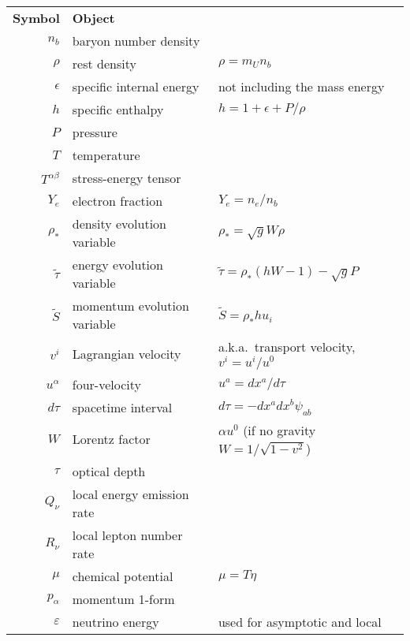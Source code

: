 \begin{table}
  \centering
  \begin{tabular}{rll}
    \textbf{Symbol}       & \textbf{Object}           & \\%
    $n_b$                 & baryon number density     & \\
    $\rho$                & rest density              & $\rho=m_U n_b $ \\
    $\epsilon$            & specific internal energy  & not including the mass energy \\
    $h$                   & specific enthalpy         & $h=1+\epsilon+P/\rho$\\
    $P$                   & pressure                  & \\
    $T$                   & temperature               & \\
    $T^{\alpha \beta}$    & stress-energy tensor      & \\
    $Y_e$                 & electron fraction         & $Y_e=n_e/n_b$\\
    $\rho_*$              & density evolution variable& $\rho_*=\sqrt{g}W\rho$ \\
    $\tilde\tau$          & energy evolution variable & $\tilde\tau=\rho_*(hW-1)-\sqrt{g}P$ \\
    $\tilde S$            & momentum evolution variable & $\tilde S=\rho_*hu_i$\\
    $v^i$                 & Lagrangian velocity       & a.k.a.\ transport velocity, $v^i=u^i/u^0$ \\
    $u^\alpha$            & four-velocity             & $u^a=dx^a/d\tau$ \\
    $d\tau$               & spacetime interval        & $d\tau=-dx^a dx^b \psi_{ab}$ \\
    $W$                   & Lorentz factor            & $\alpha u^0$ (if no gravity $W=1/\sqrt{1-v^2}$) \\
    $\tau$                & optical depth             & \\
    $Q_\nu$               & local energy emission rate& \\
    $R_\nu$               & local lepton number rate  & \\
    $\mu$                 & chemical potential        & $\mu=T\eta$ \\
    $p_\alpha$            & momentum 1-form           & \\
    $\varepsilon$         & neutrino energy           & used for asymptotic and local \\

\end{tabular}
\end{table}
